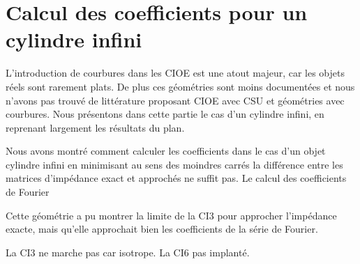 \chapter{Calcul des coefficients pour un cylindre infini}
\label{sec:cylindre}
\minitoc
\newpage
{}
L'introduction de courbures dans les CIOE est une atout majeur, car les objets réels sont rarement plats. De plus ces géométries sont moins documentées et nous n'avons pas trouvé de littérature proposant CIOE avec CSU et géométries avec courbures. Nous présentons dans cette partie le cas d'un cylindre infini, en reprenant largement les résultats du plan.







Nous avons montré comment calculer les coefficients dans le cas d'un objet cylindre infini en minimisant au sens des moindres carrés la différence entre les matrices d'impédance exact et approchés ne suffit pas. Le calcul des coefficients de Fourier

Cette géométrie a pu montrer la limite de la CI3 pour approcher l'impédance exacte, mais qu'elle approchait bien les coefficients de la série de Fourier.

\begin{TODO}
  La CI3 ne marche pas car isotrope. La CI6 pas implanté.
\end{TODO}